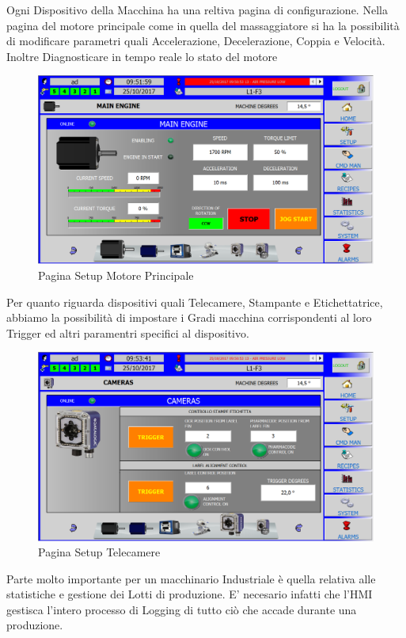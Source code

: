 \documentclass[12pt, a4paper, oneside]{book}
\begin{document}
Ogni Dispositivo della Macchina ha una reltiva pagina di configurazione. Nella pagina del motore principale come in quella del massaggiatore si ha la possibilità di modificare parametri quali Accelerazione, Decelerazione, Coppia e Velocità. Inoltre Diagnosticare in tempo reale lo stato del motore
\begin{figure}[H]
	\centering
	\includegraphics[width=13cm]{Immagini/HMI7}
	\caption{Pagina Setup Motore Principale}
	\label{HMI7}
\end{figure}
Per quanto riguarda dispositivi quali Telecamere, Stampante e Etichettatrice, abbiamo la possibilità di impostare i Gradi macchina corrispondenti al loro Trigger ed altri paramentri specifici al dispositivo.
\begin{figure}[H]
	\centering
	\includegraphics[width=13cm]{Immagini/HMI10}
	\caption{Pagina Setup Telecamere}
	\label{HMI10}
\end{figure}

Parte molto importante per un macchinario Industriale è quella relativa alle statistiche e gestione dei Lotti di produzione. E' necesario infatti che l'HMI gestisca l'intero processo di Logging di tutto ciò che accade durante una produzione. 
\end{document}
